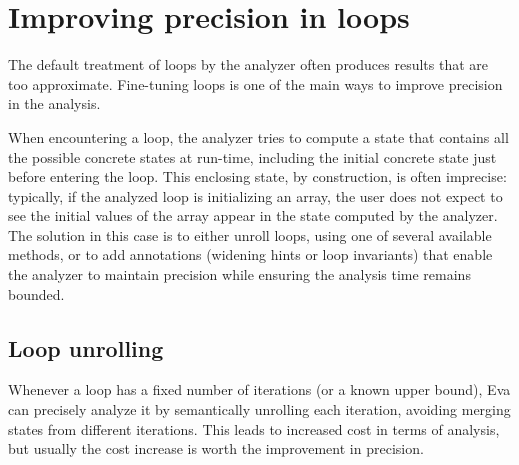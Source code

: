 \documentclass{frama-c-book}
\begin{document}
%

\section{Improving precision in loops}
\label{boucles-traitement}

The default treatment of loops by the analyzer often produces
results that are too approximate.
Fine-tuning loops is one of the main ways to improve precision in the analysis.

When encountering a loop, the analyzer tries to compute a state
that contains all the possible concrete states at run-time,
including the initial concrete state just before entering the loop.
This enclosing state, by construction, is often imprecise:
typically, if the analyzed loop is initializing an array,
the user does not expect to see the initial values of
the array appear in the state computed by the analyzer.
The solution in this case is to either unroll loops, using one of several
available methods, or to add annotations (widening hints or loop invariants)
that enable the analyzer to maintain precision while ensuring the analysis
time remains bounded.

\subsection{Loop unrolling}
\label{loop-unroll}

Whenever a loop has a fixed number of iterations (or a known upper bound),
Eva can precisely analyze it by semantically unrolling each iteration,
avoiding merging states from different iterations.
This leads to increased cost in terms of analysis, but usually the cost
increase is worth the improvement in precision.
\end{document}
